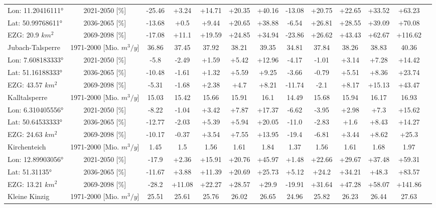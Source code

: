 \begin{longtable}{@{\extracolsep{\fill}}lc|ccccc||cccccc}
\cline{2-12} 
Lon: 11.20416111° & 2021-2050 [\%]  & -25.46 & +3.24 & +14.71 & +20.35 & +40.16 & -13.08 & +20.75 & +22.65 & +33.52 & +63.23\\ 
Lat: 50.99768611° & 2036-2065 [\%]  & -13.68 & +0.5 & +9.44 & +20.65 & +38.88 & -6.54 & +26.81 & +28.55 & +39.09 & +70.08\\ 
EZG: 20.9 $km^2$ & 2069-2098 [\%]  & -17.08 & +11.1 & +19.59 & +24.85 & +34.94 & -23.86 & +26.62 & +43.43 & +62.67 & +116.62\\ 
\hline 
Jubach-Talsperre & 1971-2000 [Mio. $m^3/y$]  & 36.86 & 37.45 & 37.92 & 38.21 & 39.35 & 34.81 & 37.84 & 38.26 & 38.83 & 40.36\\ 
\cline{2-12} 
Lon: 7.608183333° & 2021-2050 [\%]  & -5.8 & -2.49 & +1.59 & +5.42 & +12.96 & -4.17 & -1.01 & +3.14 & +7.28 & +14.42\\ 
Lat: 51.16188333° & 2036-2065 [\%]  & -10.48 & -1.61 & +1.32 & +5.59 & +9.25 & -3.66 & -0.79 & +5.51 & +8.36 & +23.74\\ 
EZG: 43.57 $km^2$ & 2069-2098 [\%]  & -5.31 & -1.68 & +2.38 & +4.7 & +8.21 & -11.74 & -2.1 & +8.17 & +15.13 & +43.47\\ 
\hline 
Kalltalsperre & 1971-2000 [Mio. $m^3/y$]  & 15.03 & 15.42 & 15.66 & 15.91 & 16.1 & 14.49 & 15.68 & 15.94 & 16.17 & 16.93\\ 
\cline{2-12} 
Lon: 6.310405556° & 2021-2050 [\%]  & -8.22 & -1.04 & +3.42 & +7.87 & +17.37 & -6.62 & -3.95 & +2.98 & +7.3 & +15.62\\ 
Lat: 50.64533333° & 2036-2065 [\%]  & -12.77 & -2.03 & +5.39 & +5.94 & +20.05 & -11.0 & -2.83 & +1.6 & +8.43 & +14.27\\ 
EZG: 24.63 $km^2$ & 2069-2098 [\%]  & -10.17 & -0.37 & +3.54 & +7.55 & +13.95 & -19.4 & -6.81 & +3.44 & +8.62 & +25.3\\ 
\hline 
Kirchenteich & 1971-2000 [Mio. $m^3/y$]  & 1.45 & 1.5 & 1.56 & 1.61 & 1.84 & 1.37 & 1.56 & 1.61 & 1.68 & 1.97\\ 
\cline{2-12} 
Lon: 12.89903056° & 2021-2050 [\%]  & -17.9 & +2.36 & +15.91 & +20.76 & +45.97 & +1.48 & +22.66 & +29.67 & +37.48 & +59.31\\ 
Lat: 51.31135° & 2036-2065 [\%]  & -11.67 & +3.88 & +11.39 & +20.69 & +25.73 & +5.12 & +24.2 & +34.21 & +48.3 & +83.57\\ 
EZG: 13.21 $km^2$ & 2069-2098 [\%]  & -28.2 & +11.08 & +22.27 & +28.57 & +29.9 & -19.91 & +31.64 & +47.28 & +58.07 & +141.86\\ 
\hline 
Kleine Kinzig & 1971-2000 [Mio. $m^3/y$]  & 25.51 & 25.61 & 25.76 & 26.02 & 26.65 & 24.96 & 25.82 & 26.23 & 26.44 & 27.63\\ 

\end{longtable}
